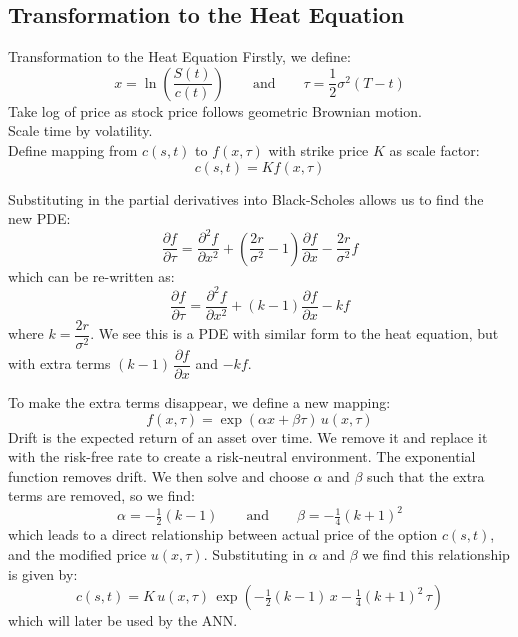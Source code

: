 \subsection{Transformation to the Heat Equation}

\begin{frame}{Transformation to the Heat Equation}
    Firstly, we define:
    \[x = \ln\!\left(\frac{S(t)}{c(t)}\right) \qquad \text{and} \qquad \tau = \frac{1}{2} \sigma^2 (T - t)\]
    Take log of price as stock price follows geometric Brownian motion. \\
    Scale time by volatility. \\
    Define mapping from $c(s,t)$ to $f(x,\tau)$ with strike price $K$ as scale factor:
    \[c(s,t) = K f(x,\tau)\]
\end{frame}

\begin{frame}
    Substituting in the partial derivatives into Black-Scholes allows us to find the new PDE:
    \[\frac{\partial f}{\partial \tau} = \frac{\partial^2 f}{\partial x^2} + \left(\frac{2r}{\sigma^2} - 1\right) \frac{\partial f}{\partial x} - \frac{2r}{\sigma^2} f\]
    which can be re-written as:
    \[\frac{\partial f}{\partial \tau} = \frac{\partial^2 f}{\partial x^2} + (k - 1) \frac{\partial f}{\partial x} - k f\]
    where $k = \dfrac{2r}{\sigma^2}$. We see this is a PDE with similar form to the heat equation, but with extra terms $(k - 1)\,\dfrac{\partial f}{\partial x}$ and $-kf$.
\end{frame}

\begin{frame}
    To make the extra terms disappear, we define a new mapping:
    \[f(x,\tau) = \exp(\alpha x + \beta \tau)\, u(x,\tau)\]
    Drift is the expected return of an asset over time. We remove it and replace it with the risk-free rate to create a risk-neutral environment.
    The exponential function removes drift.
    We then solve and choose $\alpha$ and $\beta$ such that the extra terms are removed, so we find:
    \[\alpha = -\tfrac{1}{2}(k - 1) \qquad \text{and} \qquad \beta = -\tfrac{1}{4}(k + 1)^2\]
    which leads to a direct relationship between actual price of the option $c(s,t)$, and the modified price $u(x,\tau)$.
    Substituting in $\alpha$ and $\beta$ we find this relationship is given by:
    \[c(s,t) = K\, u(x,\tau)\, \exp\!\left(-\tfrac{1}{2}(k - 1)\,x - \tfrac{1}{4}(k + 1)^2\,\tau \right)\]
    which will later be used by the ANN.
\end{frame}

